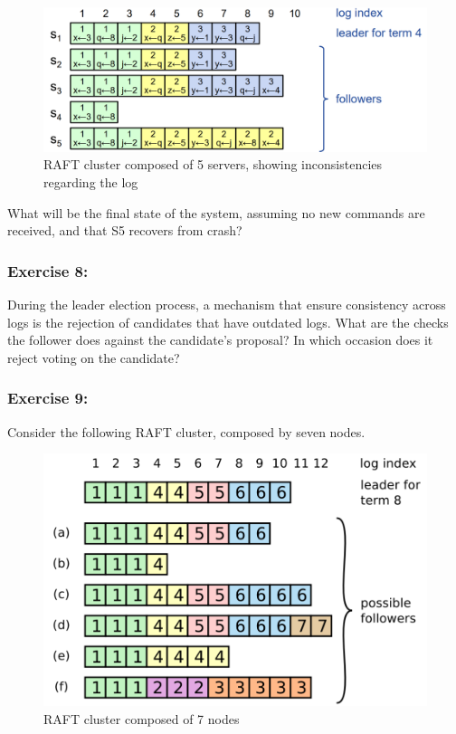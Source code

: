 \documentclass[12pt,a4paper]{article}
\begin{document}
\begin{figure}[H]
    \centering
    \includegraphics[scale=0.6]{figures/inconsistent_logs.png}
    \caption{RAFT cluster composed of 5 servers, showing inconsistencies regarding the log}
    \label{fig:inconsistent_logs}
\end{figure}

What will be the final state of the system, assuming no new commands are received, and that S5 recovers from crash?


\subsubsection*{Exercise 8:} During the leader election process, a mechanism that ensure consistency across logs is the rejection of candidates that have outdated logs. What are the checks the follower does against the candidate's proposal? In which occasion does it reject voting on the candidate?


\subsubsection*{Exercise 9:} Consider the following RAFT cluster, composed by seven nodes.

\begin{figure}[H]
    \centering
    \includegraphics[scale=0.6]{figures/discussion.png}
    \caption{RAFT cluster composed of 7 nodes}
    \label{fig:inconsistent_logs}
\end{figure}
\end{document}
